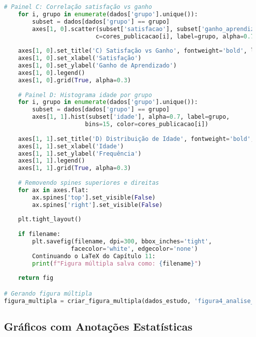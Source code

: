 \begin{pythonbox}
\begin{lstlisting}[language=Python]       
    # Painel C: Correlação satisfação vs ganho
    for i, grupo in enumerate(dados['grupo'].unique()):
        subset = dados[dados['grupo'] == grupo]
        axes[1, 0].scatter(subset['satisfacao'], subset['ganho_aprendizado'],
                          c=cores_publicacao[i], label=grupo, alpha=0.7)
    
    axes[1, 0].set_title('C) Satisfação vs Ganho', fontweight='bold', loc='left')
    axes[1, 0].set_xlabel('Satisfação')
    axes[1, 0].set_ylabel('Ganho de Aprendizado')
    axes[1, 0].legend()
    axes[1, 0].grid(True, alpha=0.3)
    
    # Painel D: Histograma idade por grupo
    for i, grupo in enumerate(dados['grupo'].unique()):
        subset = dados[dados['grupo'] == grupo]
        axes[1, 1].hist(subset['idade'], alpha=0.7, label=grupo, 
                       bins=15, color=cores_publicacao[i])
    
    axes[1, 1].set_title('D) Distribuição de Idade', fontweight='bold', loc='left')
    axes[1, 1].set_xlabel('Idade')
    axes[1, 1].set_ylabel('Frequência')
    axes[1, 1].legend()
    axes[1, 1].grid(True, alpha=0.3)
    
    # Removendo spines superiores e direitas
    for ax in axes.flat:
        ax.spines['top'].set_visible(False)
        ax.spines['right'].set_visible(False)
    
    plt.tight_layout()
    
    if filename:
        plt.savefig(filename, dpi=300, bbox_inches='tight', 
                   facecolor='white', edgecolor='none')
        Continuando o LaTeX do Capítulo 11:
        print(f"Figura múltipla salva como: {filename}")
    
    return fig

# Gerando figura múltipla
figura_multipla = criar_figura_multipla(dados_estudo, 'figura4_analise_completa.png')
\end{lstlisting}
\end{pythonbox}

\subsection{Gráficos com Anotações Estatísticas}

